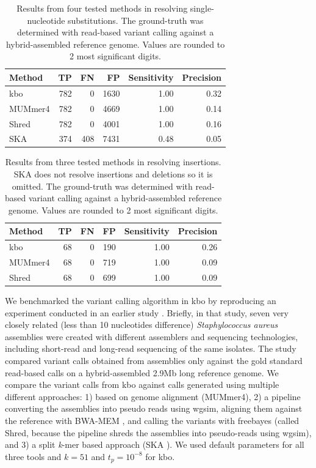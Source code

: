 \documentclass[unnumsec,webpdf,contemporary,large]{oup-authoring-template}%
\theoremstyle{thmstyleone}%
\theoremstyle{thmstyletwo}%
\theoremstyle{thmstylethree}%
\newcommand{\kbo}{{\sf kbo}}
\begin{document}
\begin{table}[]
\centering
\begin{tabular}{lrrrrr}
Method & TP  & FN  & FP   & Sensitivity & Precision \\
\hline
\kbo    & 782 & 0   & 1630 & 1.00    & 0.32  \\
MUMmer4 & 782 & 0   & 4669 & 1.00    & 0.14  \\
Shred  & 782 & 0   & 4001 & 1.00    & 0.16  \\
SKA    & 374 & 408 & 7431 & 0.48    & 0.05
\end{tabular}
\caption{Results from four tested methods in resolving single-nucleotide substitutions. The ground-truth was determined with read-based variant calling against a hybrid-assembled reference genome. Values are rounded to 2 most significant digits.}
\label{vc-snps}
\end{table}
\begin{table}[]
\centering
\begin{tabular}{lrrrrr}
Method & TP & FN & FP  & Sensitivity & Precision \\
\hline
\kbo    & 68 & 0  & 190 & 1.00    & 0.26  \\
MUMmer4 & 68 & 0  & 719 & 1.00    & 0.09  \\
Shred  & 68 & 0  & 699 & 1.00    & 0.09  
\end{tabular}
\caption{Results from three tested methods in resolving insertions. SKA does not resolve insertions and deletions so it is omitted. The ground-truth was determined with read-based variant calling against a hybrid-assembled reference genome. Values are rounded to 2 most significant digits.}
\label{vc-indels}
\end{table}

We benchmarked the variant calling algorithm in {\sf kbo} by reproducing an experiment conducted in an earlier study \cite{wick2025reads}. Briefly, in that study, seven very closely related (less than 10 nucleotides difference) \textit{Staphylococcus aureus} assemblies were created with different assemblers and sequencing technologies, including short-read and long-read sequencing of the same isolates. The study compared variant calls obtained from assemblies only against the gold standard read-based calls on a hybrid-assembled 2.9Mb long reference genome. We compare the variant calls from {\sf kbo} against calls generated using multiple different approaches: 1) based on genome alignment (MUMmer4\cite{marccais2018mummer4}), 2) a pipeline converting the assemblies into pseudo reads using wgsim, aligning them against the reference with BWA-MEM \cite{li2013aligning}, and calling the variants with freebayes \cite{garrison2012haplotype} (called Shred, because the pipeline shreds the assemblies into pseudo-reads using wgsim), and 3) a split \emph{k}-mer based approach (SKA \cite{derelle2024seamless}). We used default parameters for all three tools and $k = 51$ and $t_p = 10^{-8}$ for {\sf kbo}.
\end{document}
